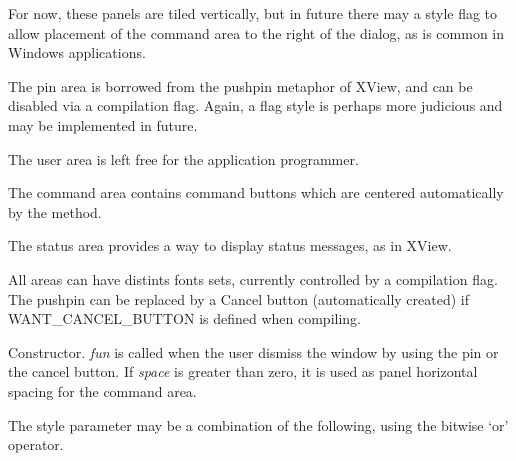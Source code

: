 For now, these panels are tiled vertically, but in future there may a
style flag to allow placement of the command area to the right of the dialog, as
is common in Windows applications.

The pin area is borrowed from the pushpin metaphor of XView, and can be
disabled via a compilation flag. Again, a flag style is perhaps more
judicious and may be implemented in future.

The user area is left free for the application programmer.

The command area contains command buttons which are centered automatically
by the  method.

The status area provides a way to display status messages, as in XView.

All areas can have distints fonts sets, currently controlled by a compilation
flag. The pushpin can be replaced by a Cancel button (automatically created)
if WANT\_CANCEL\_BUTTON is defined when compiling.




Constructor. {\it fun} is called when the user dismiss the window by
using the pin or the cancel button. If {\it space} is greater than zero, it is
used as panel horizontal spacing for the command area.

The style parameter may be a combination of the following, using the bitwise `or' operator.

\begin{twocollist}\itemsep=0pt
\end{twocollist}

